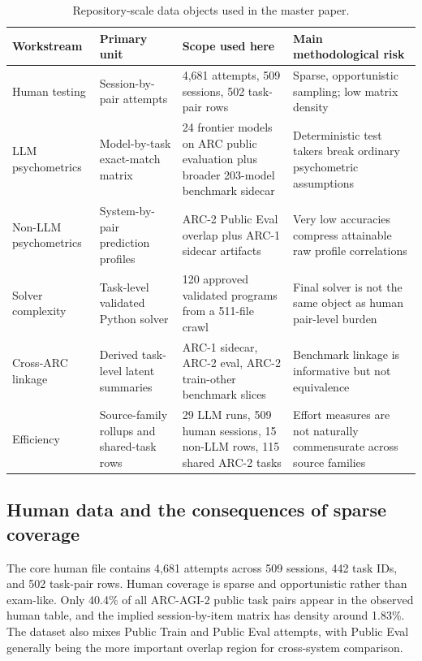 \begin{table}[t]
\centering
\small
\caption{Repository-scale data objects used in the master paper.}
\begin{tabular}{p{1.2in}p{1.3in}p{1.5in}p{2.1in}}
\toprule
\textbf{Workstream} & \textbf{Primary unit} & \textbf{Scope used here} & \textbf{Main methodological risk} \\
\midrule
Human testing & Session-by-pair attempts & 4,681 attempts, 509 sessions, 502 task-pair rows & Sparse, opportunistic sampling; low matrix density \\
LLM psychometrics & Model-by-task exact-match matrix & 24 frontier models on ARC public evaluation plus broader 203-model benchmark sidecar & Deterministic test takers break ordinary psychometric assumptions \\
Non-LLM psychometrics & System-by-pair prediction profiles & ARC-2 Public Eval overlap plus ARC-1 sidecar artifacts & Very low accuracies compress attainable raw profile correlations \\
Solver complexity & Task-level validated Python solver & 120 approved validated programs from a 511-file crawl & Final solver is not the same object as human pair-level burden \\
Cross-ARC linkage & Derived task-level latent summaries & ARC-1 sidecar, ARC-2 eval, ARC-2 train-other benchmark slices & Benchmark linkage is informative but not equivalence \\
Efficiency & Source-family rollups and shared-task rows & 29 LLM runs, 509 human sessions, 15 non-LLM rows, 115 shared ARC-2 tasks & Effort measures are not naturally commensurate across source families \\
\bottomrule
\end{tabular}
\end{table}

\subsection{Human data and the consequences of sparse coverage}

The core human file contains 4,681 attempts across 509 sessions, 442 task IDs, and 502 task-pair rows. Human coverage is sparse and opportunistic rather than exam-like. Only 40.4\% of all ARC-AGI-2 public task pairs appear in the observed human table, and the implied session-by-item matrix has density around 1.83\%. The dataset also mixes Public Train and Public Eval attempts, with Public Eval generally being the more important overlap region for cross-system comparison.

